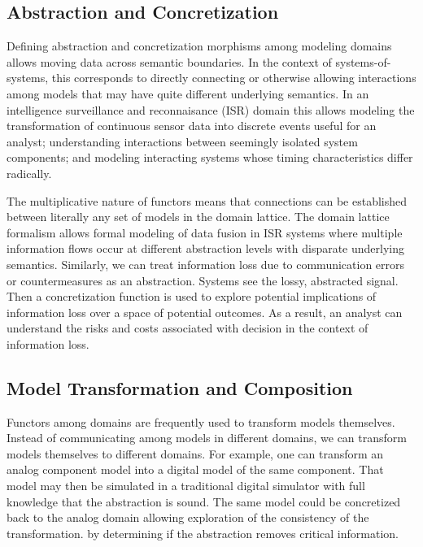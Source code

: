 \documentclass[12pt]{article}
\begin{document}
\subsection{Abstraction and Concretization}

Defining abstraction and concretization morphisms among modeling
domains allows moving data across semantic boundaries.  In the context
of systems-of-systems, this corresponds to directly connecting or
otherwise allowing interactions among models that may have quite
different underlying semantics.  In an intelligence surveillance and
reconnaisance (ISR) domain this allows modeling the transformation of
continuous sensor data into discrete events useful for an analyst;
understanding interactions between seemingly isolated system
components; and modeling interacting systems whose timing
characteristics differ radically.

The multiplicative nature of functors means that connections can be
established between literally any set of models in the domain lattice.
The domain lattice formalism allows formal modeling of data fusion in
ISR systems where multiple information flows occur at different
abstraction levels with disparate underlying semantics.  Similarly, we
can treat information loss due to communication errors or
countermeasures as an abstraction.  Systems see the lossy, abstracted
signal. Then a concretization function is used to explore potential
implications of information loss over a space of potential
outcomes. As a result, an analyst can understand the risks and costs
associated with decision in the context of information loss.

\subsection{Model Transformation and Composition}

Functors among domains are frequently used to transform models
themselves.  Instead of communicating among models in different
domains, we can transform models themselves to different domains.  For
example, one can transform an analog component model into a digital
model of the same component.  That model may then be simulated in a
traditional digital simulator with full knowledge that the abstraction
is sound.  The same model could be concretized back to the analog
domain allowing exploration of the consistency of the transformation.
by determining if the abstraction removes critical information.
\end{document}
